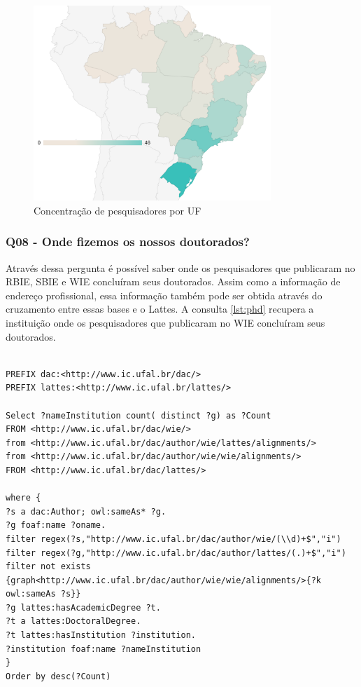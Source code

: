 \begin{figure}[!ht]
	\centering
	\includegraphics[width=0.8\textwidth]{./imagens/where.pdf}
	\caption{Concentração de pesquisadores por UF}
	\label{fig:where}
\end{figure}

\subsubsection{Q08 - Onde fizemos os nossos doutorados?}
Através dessa pergunta é possível saber onde os pesquisadores que publicaram no RBIE, SBIE e WIE concluíram seus doutorados. Assim como a informação de endereço profissional, essa informação também pode ser obtida através do cruzamento entre essas bases e o Lattes. A consulta \ref{lst:phd} recupera a instituição onde os pesquisadores que publicaram no WIE concluíram seus doutorados.

\begin{lstlisting}[captionpos=b, caption= Consulta para recuperar a concentração de doutorados por universidade, label=lst:phd,
basicstyle=\ttfamily,frame=single]

PREFIX dac:<http://www.ic.ufal.br/dac/>
PREFIX lattes:<http://www.ic.ufal.br/lattes/>

Select ?nameInstitution count( distinct ?g) as ?Count
FROM <http://www.ic.ufal.br/dac/wie/>
from <http://www.ic.ufal.br/dac/author/wie/lattes/alignments/>
from <http://www.ic.ufal.br/dac/author/wie/wie/alignments/>
FROM <http://www.ic.ufal.br/dac/lattes/>

where {
?s a dac:Author; owl:sameAs* ?g.
?g foaf:name ?oname.
filter regex(?s,"http://www.ic.ufal.br/dac/author/wie/(\\d)+$","i")
filter regex(?g,"http://www.ic.ufal.br/dac/author/lattes/(.)+$","i")
filter not exists {graph<http://www.ic.ufal.br/dac/author/wie/wie/alignments/>{?k owl:sameAs ?s}}
?g lattes:hasAcademicDegree ?t.
?t a lattes:DoctoralDegree.
?t lattes:hasInstitution ?institution.
?institution foaf:name ?nameInstitution
}
Order by desc(?Count)
\end{lstlisting}

